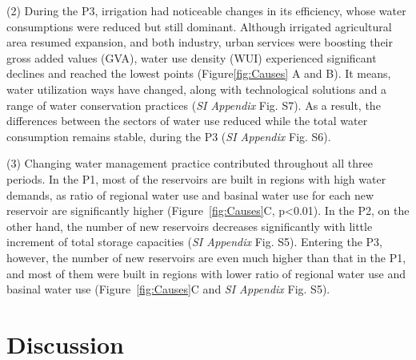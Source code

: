 \documentclass[9pt, twocolumn, twoside, lineno]{pnas-new}
\begin{document}
(2) During the P3, irrigation had noticeable changes in its efficiency, whose water consumptions were reduced but still dominant. Although irrigated agricultural area resumed expansion, and both industry, urban services were boosting their gross added values (GVA), water use density (WUI) experienced significant declines and reached the lowest points (Figure\ref{fig:Causes} A and B). It means, water utilization ways  have changed, along with technological solutions and a range of water conservation practices (\textit{SI Appendix} Fig. S7). As a result, the differences between the sectors of water use reduced while the total water consumption remains stable, during the P3 (\textit{SI Appendix} Fig. S6).

(3) Changing water management practice contributed throughout all three periods. In the P1, most of the reservoirs are built in regions with high water demands, as ratio of regional water use and basinal water use for each new reservoir are significantly higher (Figure~\ref{fig:Causes}C, p<0.01). In the P2, on the other hand, the number of new reservoirs decreases significantly with little increment of total storage capacities (\textit{SI Appendix} Fig. S5). Entering the P3, however, the number of new reservoirs are even much higher than that in the P1, and most of them were built in regions with lower ratio of regional water use and basinal water use (Figure~\ref{fig:Causes}C and \textit{SI Appendix} Fig. S5).

\section*{Discussion}
\end{document}
